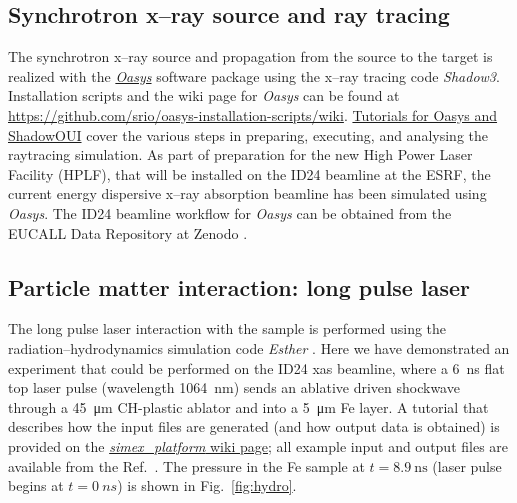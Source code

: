\subsection{Synchrotron x--ray source and ray tracing}
The synchrotron x--ray source and propagation from the source to the target is
realized with the
\href{http://ftp.esrf.eu/pub/scisoft/Oasys/readme.html}{\textit{Oasys}}
software package using the x--ray tracing
code \textit{Shadow3}. Installation scripts and the wiki page for \textit{Oasys} can be
found at
\href{https://github.com/srio/oasys-installation-scripts/wiki}{https://github.com/srio/oasys-installation-scripts/wiki}.
\href{https://github.com/srio/ShadowOui-Tutorial}{Tutorials for
Oasys and ShadowOUI} cover the various steps in preparing, executing, and
analysing the raytracing simulation. As part of preparation for the new High Power
Laser Facility (HPLF), that will be installed on the ID24 beamline at the ESRF,
the current energy dispersive x--ray absorption beamline has been simulated using
\textit{Oasys}.
The ID24 beamline workflow for \textit{Oasys} can be obtained from the EUCALL Data
Repository at Zenodo \cite{Briggs2017.zenodo.886451}.

\subsection{Particle matter interaction: long pulse laser}
The long pulse laser interaction with the sample is performed using the
radiation--hydrodynamics simulation code \textit{Esther} \cite{Colombier2005}.
Here we have demonstrated an experiment that could be performed on the
ID24 \gls{xas} beamline, where a \SI{6}{\nano\second} flat top laser pulse (wavelength
\SI{1064}{\nano\metre}) sends an ablative
driven shockwave through a \SI{45}{\micro\metre} CH-plastic ablator and into a
\SI{5}{\micro\metre} Fe layer. A
tutorial that describes how the input files are generated (and how output data is
obtained) is provided on the
\href{https://www.github.com/eucall-software/simex_platform/wiki/Esther-Hydrocode-Tutorial}{\textit{simex\_platform} wiki page}; all example input
and output files are available from the Ref.~\cite{Briggs2017.zenodo.883106}.
The pressure in the Fe sample at $t = \SI{8.9}{\nano\second}$
(laser pulse begins at $t = \SI{0}{ns}$) is shown in Fig.~\ref{fig:hydro}.

